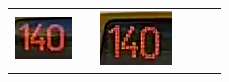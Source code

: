 \begin{table}[h!]
\begin{tabular}{c l c l c l}
\begin{minipage}{.2\textwidth}
      \includegraphics[width=\textwidth]{img/exp_number_f05}
    \end{minipage}
    &
    
    &
    \begin{minipage}{.2\textwidth}
      \includegraphics[width=\textwidth]{img/exp_number_f06}
    \end{minipage}
    &
    

\end{tabular}
\end{table}
